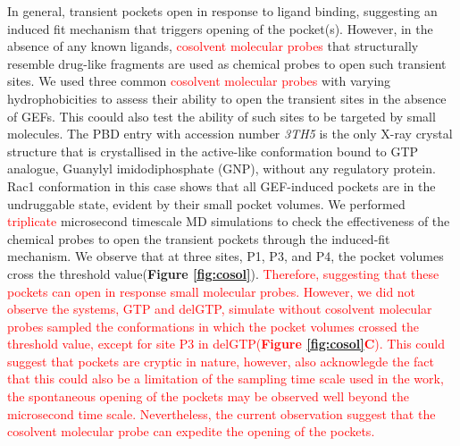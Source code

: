 \documentclass[12pt,a4paper]{achemso}
\begin{document}
In general, transient pockets open in response to ligand binding, suggesting an induced fit mechanism that triggers opening of the pocket(s). However, in the absence of any known ligands, \textcolor{red}{cosolvent molecular probes} that structurally resemble drug-like fragments are used as chemical probes to open such transient sites. We used three common \textcolor{red}{cosolvent molecular probes} with varying hydrophobicities to assess their ability to open the transient sites in the absence of GEFs. This coould also test the ability of such sites to be targeted by small molecules. The PBD entry with accession number \emph{3TH5} is the only X-ray crystal structure that is crystallised in the active-like conformation bound to GTP analogue, Guanylyl imidodiphosphate (GNP), without any regulatory protein. Rac1 conformation in this case shows that all GEF-induced pockets are in the undruggable state, evident by their small pocket volumes. We performed \textcolor{red}{triplicate} microsecond timescale MD simulations to check the effectiveness of the chemical probes to open the transient pockets through the induced-fit mechanism. We observe that at three sites, P1, P3, and P4, the pocket volumes cross the threshold value(\textbf{Figure \ref{fig:cosol}}).  \textcolor{red}{Therefore, suggesting that these pockets can open in response small molecular probes. However, we did not observe the systems, GTP and delGTP, simulate without cosolvent molecular probes sampled the conformations in which the pocket volumes crossed the threshold value, except for site P3 in delGTP(\textbf{Figure \ref{fig:cosol}C}). This could suggest that pockets are cryptic in nature, however, also acknowlegde the fact that this could also be a limitation of the sampling time scale used in the work, the spontaneous opening of the pockets may be observed well beyond the microsecond time scale.  Nevertheless, the current observation suggest that the cosolvent molecular probe can expedite the opening of the pockets.}
\end{document}
